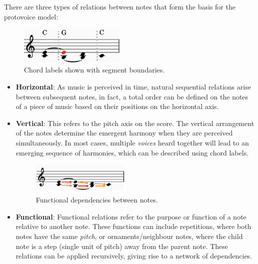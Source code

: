 \documentclass[12pt,a4paper,twoside,openright]{report}
\theoremstyle{definition}
\begin{document}
There are three types of relations between notes that form the basis for the protovoice model:

\begin{figure}[h]
  \centering
  \includegraphics[width=0.45\textwidth]{prep/cadenceharmony}
  \captionsetup{width=.9\linewidth}
  \caption{Chord labels shown with segment boundaries.}
  \label{fig:cadenceHarmony}
\end{figure}
\begin{itemize}
  \item \textbf{Horizontal}: As music is perceived in time, natural sequential relations arise between subsequent notes, in fact, a total order can be defined on the notes of a piece of music based on their positions on the horizontal axis.
  \item \textbf{Vertical}: This refers to the pitch axis on the score. The vertical arrangement of the notes determine the emergent harmony when they are perceived simultaneously. In most cases, multiple \textit{voices} heard together will lead to an emerging sequence of harmonies, which can be described using chord labels.

\begin{figure}[h]
  \centering
  \includegraphics[width=0.45\textwidth]{prep/cadencefunctions}
  \captionsetup{width=.9\linewidth}
  \caption{Functional dependencies between notes.}
  \label{fig:cadenceFunctions}
\end{figure}
  \item \textbf{Functional}: Functional relations refer to the purpose or function of a note relative to another note. These functions can include repetitions, where both notes have the same \textit{pitch}, or ornaments/neighbour notes, where the child note is a step (single unit of pitch) away from the parent note. These relations can be applied recursively, giving rise to a network of dependencies.

\end{itemize}

\FloatBarrier
\end{document}
